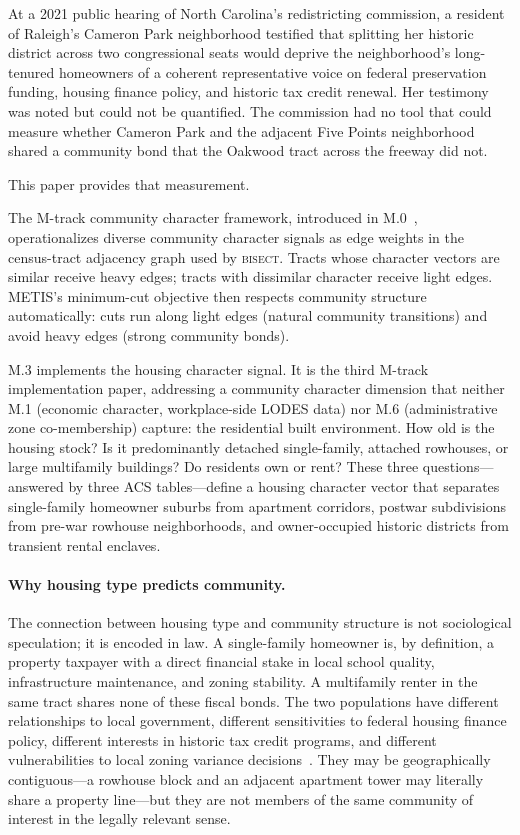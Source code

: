 \label{sec:introduction}

At a 2021 public hearing of North Carolina's redistricting commission, a resident
of Raleigh's Cameron Park neighborhood testified that splitting her historic
district across two congressional seats would deprive the neighborhood's
long-tenured homeowners of a coherent representative voice on federal preservation
funding, housing finance policy, and historic tax credit renewal.
Her testimony was noted but could not be quantified.
The commission had no tool that could measure whether Cameron Park and the
adjacent Five Points neighborhood shared a community bond that the Oakwood
tract across the freeway did not.

This paper provides that measurement.

The M-track community character framework, introduced in M.0~\citep{m0framework},
operationalizes diverse community character signals as edge weights in the
census-tract adjacency graph used by \textsc{bisect}.
Tracts whose character vectors are similar receive heavy edges; tracts with
dissimilar character receive light edges.
METIS's minimum-cut objective then respects community structure automatically:
cuts run along light edges (natural community transitions) and avoid heavy
edges (strong community bonds).

M.3 implements the housing character signal.
It is the third M-track implementation paper, addressing a community character
dimension that neither M.1 (economic character, workplace-side LODES data)
nor M.6 (administrative zone co-membership) capture: the residential built
environment.
How old is the housing stock?
Is it predominantly detached single-family, attached rowhouses, or large
multifamily buildings?
Do residents own or rent?
These three questions---answered by three ACS tables---define a housing
character vector that separates single-family homeowner suburbs from
apartment corridors, postwar subdivisions from pre-war rowhouse neighborhoods,
and owner-occupied historic districts from transient rental enclaves.

\paragraph{Why housing type predicts community.}
The connection between housing type and community structure is not sociological
speculation; it is encoded in law.
A single-family homeowner is, by definition, a property taxpayer with a direct
financial stake in local school quality, infrastructure maintenance, and
zoning stability.
A multifamily renter in the same tract shares none of these fiscal bonds.
The two populations have different relationships to local government, different
sensitivities to federal housing finance policy, different interests in
historic tax credit programs, and different vulnerabilities to local zoning
variance decisions~\citep{fischel2001}.
They may be geographically contiguous---a rowhouse block and an adjacent
apartment tower may literally share a property line---but they are not members
of the same community of interest in the legally relevant sense.

